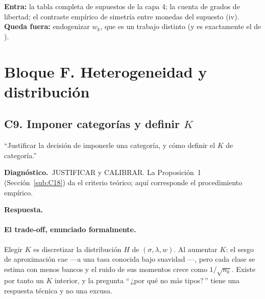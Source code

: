 \documentclass[11pt]{article}
\newcommand{\diag}[1]{\par\noindent\textbf{Diagn\'ostico.}\ #1\par}
\newcommand{\resp}{\par\noindent\textbf{Respuesta.}\par}
\theoremstyle{definition}
\begin{document}
\begin{ie2}
\textbf{Entra:} la tabla completa de supuestos de la capa 4; la cuenta de grados
de libertad; el contraste emp\'irico de simetr\'ia entre monedas del supuesto (iv).
\textbf{Queda fuera:} endogenizar $w_k$, que es un trabajo distinto (y es
exactamente el de \citet{castillo2016}).
\end{ie2}

\section{Bloque F. Heterogeneidad y distribuci\'on}

\subsection{C9. Imponer categor\'ias y definir $K$}\label{sub:C9}

\begin{jurado}
``Justificar la decisi\'on de imponerle una categor\'ia, y c\'omo definir el $K$ de
categor\'ia.''
\end{jurado}

\diag{JUSTIFICAR y CALIBRAR. La Proposici\'on~1 (Secci\'on~\ref{sub:C18}) da el
criterio te\'orico; aqu\'i corresponde el procedimiento emp\'irico.}

\resp

\paragraph{El trade-off, enunciado formalmente.} Elegir $K$ es discretizar la
distribuci\'on $H$ de $(\sigma,\lambda,w)$. Al aumentar $K$: el sesgo de
aproximaci\'on cae ---a una tasa conocida bajo suavidad
\citep{bonhomme2022}---, pero cada clase se estima con menos bancos y el ruido
de sus momentos crece como $1/\sqrt{n_k}$. Existe por tanto un $K$ interior, y la
pregunta ``\,¿por qu\'e no m\'as tipos?\,'' tiene una respuesta t\'ecnica y no una
excusa.
\end{document}
